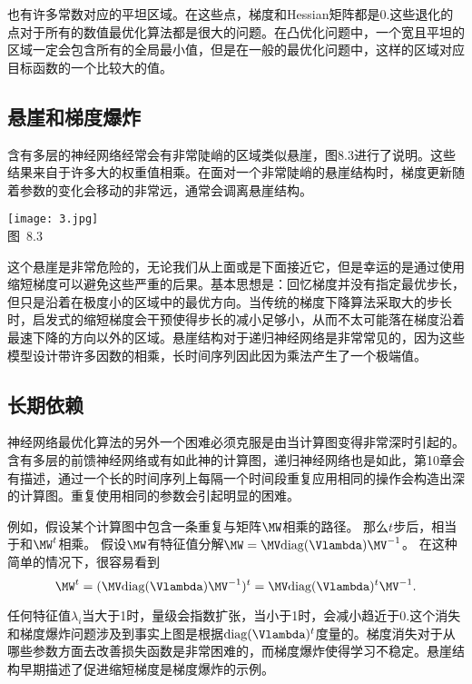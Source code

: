 也有许多常数对应的平坦区域。在这些点，梯度和Hessian矩阵都是0.这些退化的点对于所有的数值最优化算法都是很大的问题。在凸优化问题中，一个宽且平坦的区域一定会包含所有的全局最小值，但是在一般的最优化问题中，这样的区域对应目标函数的一个比较大的值。

\subsection{悬崖和梯度爆炸}
含有多层的神经网络经常会有非常陡峭的区域类似悬崖，图8.3进行了说明。这些结果来自于许多大的权重值相乘。在面对一个非常陡峭的悬崖结构时，梯度更新随着参数的变化会移动的非常远，通常会调离悬崖结构。

\begin{center}
\texttt{[image: 3.jpg]}\\
图~8.3
\end{center}

这个悬崖是非常危险的，无论我们从上面或是下面接近它，但是幸运的是通过使用缩短梯度可以避免这些严重的后果。基本思想是：回忆梯度并没有指定最优步长，但只是沿着在极度小的区域中的最优方向。当传统的梯度下降算法采取大的步长时，启发式的缩短梯度会干预使得步长的减小足够小，从而不太可能落在梯度沿着最速下降的方向以外的区域。悬崖结构对于递归神经网络是非常常见的，因为这些模型设计带许多因数的相乘，长时间序列因此因为乘法产生了一个极端值。

\subsection{长期依赖}
神经网络最优化算法的另外一个困难必须克服是由当计算图变得非常深时引起的。含有多层的前馈神经网络或有如此神的计算图，递归神经网络也是如此，第10章会有描述，通过一个长的时间序列上每隔一个时间段重复应用相同的操作会构造出深的计算图。重复使用相同的参数会引起明显的困难。

例如，假设某个计算图中包含一条重复与矩阵$\MW$相乘的路径。
那么$t$步后，相当于和$\MW^t$相乘。
假设$\MW$有特征值分解$\MW = \MV \text{diag}(\Vlambda) \MV^{-1}$。
在这种简单的情况下，很容易看到
\begin{equation}
  \MW^t = (\MV \text{diag}(\Vlambda) \MV^{-1})^t = \MV\text{diag}(\Vlambda)^t  \MV^{-1}.
\end{equation}

任何特征值$\lambda_i$当大于1时，量级会指数扩张，当小于1时，会减小趋近于0.这个消失和梯度爆炸问题涉及到事实上图是根据$\text{diag}(\Vlambda)^t$度量的。梯度消失对于从哪些参数方面去改善损失函数是非常困难的，而梯度爆炸使得学习不稳定。悬崖结构早期描述了促进缩短梯度是梯度爆炸的示例。

